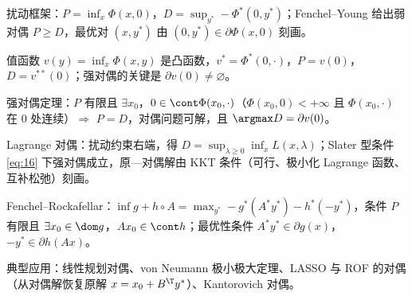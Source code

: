 \begin{keypoints}
  \item 扰动框架：$P=\inf_x\Phi(x,0)$，$D=\sup_{y^*}-\Phi^*(0,y^*)$；Fenchel--Young 给出弱对偶 $P\geqslant D$，最优对 $(x,y^*)$ 由 $(0,y^*)\in\partial\Phi(x,0)$ 刻画。
  \item 值函数 $v(y)=\inf_x\Phi(x,y)$ 是凸函数，$v^*=\Phi^*(0,\cdot)$，$P=v(0)$，$D=v^{**}(0)$；强对偶的关键是 $\partial v(0)\neq\varnothing$。
  \item 强对偶定理：$P$ 有限且 $\exists x_0$，$0\in\cont\Phi(x_0,\cdot)$（$\Phi(x_0,0)<+\infty$ 且 $\Phi(x_0,\cdot)$ 在 $0$ 处连续）$\Rightarrow$ $P=D$，对偶问题可解，且 $\argmax D=\partial v(0)$。
  \item Lagrange 对偶：扰动约束右端，得 $D=\sup_{\lambda\geqslant0}\inf_xL(x,\lambda)$；Slater 型条件 \eqref{eq:16} 下强对偶成立，原—对偶解由 KKT 条件（可行、极小化 Lagrange 函数、互补松弛）刻画。
  \item Fenchel--Rockafellar：$\inf g+h\circ A=\max_{y^*}-g^*(A^*y^*)-h^*(-y^*)$，条件 $P$ 有限且 $\exists x_0\in\dom g$，$Ax_0\in\cont h$；最优性条件 $A^*y^*\in\partial g(x)$，$-y^*\in\partial h(Ax)$。
  \item 典型应用：线性规划对偶、von Neumann 极小极大定理、LASSO 与 ROF 的对偶（从对偶解恢复原解 $x=x_0+B^\T y^*$）、Kantorovich 对偶。
\end{keypoints}
